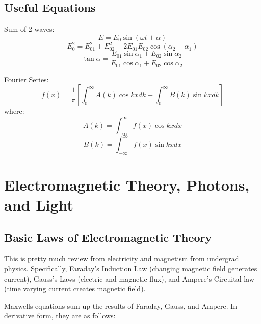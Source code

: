 \documentclass[12pt]{report}
\begin{document}
\section{Useful Equations}
Sum of 2 waves: 
\begin{equation}
E = E_0 \sin (\omega t + \alpha)
\end{equation}
\begin{equation}
E_0 ^2 = E_{01} ^2 + E_{02} ^2 + 2E_{01}E_{02} \cos (\alpha_2 - \alpha_1)
\end{equation}
\begin{equation}
\tan \alpha = \frac{E_{01} \sin \alpha_1 + E_{02} \sin \alpha_2}{E_{01} \cos \alpha_1 + E_{02} \cos \alpha_2}
\end{equation}

Fourier Series:
\begin{equation}
f(x) = \frac{1}{\pi} \left[ \int _0^\infty A(k) \cos kx dk + \int_0^\infty B(k) \sin kxdk \right]
\end{equation}
where:
\begin{equation}
A(k) = \int_{-\infty}^\infty f(x) \cos kxdx
\end{equation}
\begin{equation}
B(k) = \int_{-\infty}^\infty f(x) \sin kxdx
\end{equation}

\chapter{Electromagnetic Theory, Photons, and Light}
\section{Basic Laws of Electromagnetic Theory}
This is pretty much review from electricity and magnetism from undergrad physics. Specifically, Faraday's Induction Law (changing magnetic field generates current), Gauss's Laws (electric and magnetic flux), and Ampere's Circuital law (time varying current creates magnetic field). 

Maxwells equations sum up the results of Faraday, Gauss, and Ampere. In derivative form, they are as follows: 
\end{document}
